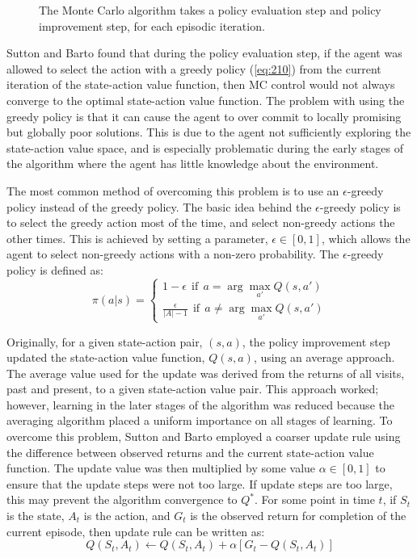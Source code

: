 \begin{figure}[h]
	\centering
	
	\caption[Monte Carlo iterative approach]{The Monte Carlo algorithm takes a policy evaluation step and policy improvement step, for each episodic iteration.}
	\label{fig:210_monte_carlo_methods}
\end{figure}

Sutton and Barto found that during the policy evaluation step, if the agent was allowed to select the action with a greedy policy (\ref{eq:210}) from the current iteration of the state-action value function, then MC control would not always converge to the optimal state-action value function. The problem with using the greedy policy is that it can cause the agent to over commit to locally promising but globally poor solutions. This is due to the agent not sufficiently exploring the state-action value space, and is especially problematic during the early stages of the algorithm where the agent has little knowledge about the environment.

The most common method of overcoming this problem is to use an $\epsilon$-greedy policy instead of the greedy policy. The basic idea behind the $\epsilon$-greedy policy is to select the greedy action most of the time, and select non-greedy actions the other times. This is achieved by setting a parameter, $\epsilon \in [0,1]$, which allows the agent to select non-greedy actions with a non-zero probability. The $\epsilon$-greedy policy is defined as:
\begin{equation}
   \pi (a | s) = %
   \begin{cases}
   		1 - \epsilon \ \ \text{if} \ \ a = \arg\max_{a'} Q(s,a') \\
   		\frac{\epsilon}{|A|-1} \ \ \text{if} \ \ a \neq \arg\max_{a'} Q(s,a')
   \end{cases} \label{eq:211}
\end{equation}

Originally, for a given state-action pair, $(s,a)$, the policy improvement step updated the state-action value function, $Q(s,a)$, using an average approach. The average value used for the update was derived from the returns of all visits, past and present, to a given state-action value pair. This approach worked; however, learning in the later stages of the algorithm was reduced because the averaging algorithm placed a uniform importance on all stages of learning. To overcome this problem, Sutton and Barto employed a coarser update rule using the difference between observed returns and the current state-action value function. The update value was then multiplied by some value $\alpha \in [0,1]$ to ensure that the update steps were not too large. If update steps are too large, this may prevent the algorithm convergence to $Q^*$. For some point in time $t$, if $S_t$ is the state, $A_t$ is the action, and $G_t$ is the observed return for completion of the current episode, then update rule can be written as:
\begin{equation}
	Q(S_t, A_t) \gets Q(S_t, A_t) + \alpha[G_t - Q(S_t, A_t)] \label{eq:212}
\end{equation}

